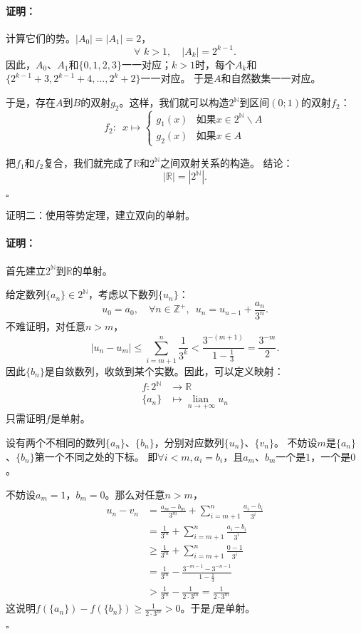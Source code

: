 \documentclass[12pt,UTF8]{ctexbook}
\newcommand{\lian}[1]{
    \underset{#1}{\operatorname{lian}\,}
}
\theoremstyle{definition}
\theoremstyle{plain}
\renewenvironment{proof}{\paragraph{\textbf{证明：}}}{\hfill$\square$}
\begin{document}
\begin{appendix}
\begin{proof}
    计算它们的势。$|A_0| = |A_1| = 2$，
    $$ \forall \,\, k > 1, \quad |A_k| = 2^{k-1}. $$
    因此，$A_0$、$A_1$和$\{0,1,2,3\}$一一对应；$k>1$时，每个$A_k$和$\{2^{k-1}+3,2^{k-1}+4,\ldots, 2^k+2\}$一一对应。
    于是$A$和自然数集一一对应。

    于是，存在$A$到$B$的双射$g_2$。这样，我们就可以构造$2^\mathbb{N}$到区间$(0;1)$的双射$f_2$：
    $$ f_2:\,\,\,x\mapsto \left\{
        \begin{array}{cl}
            g_1(x) & \mbox{如果}x \in 2^\mathbb{N}\backslash A \\
            g_2(x) & \mbox{如果}x \in A 
        \end{array}\right.
    $$

    把$f_1$和$f_2$复合，我们就完成了$\mathbb{R}$和$2^\mathbb{N}$之间双射关系的构造。
    结论：
    $$ |\mathbb{R}| = |2^\mathbb{N}|. $$

\end{proof}

证明二：使用等势定理，建立双向的单射。

\begin{proof}
    首先建立$2^\mathbb{N}$到$\mathbb{R}$的单射。

    给定数列$\{a_n\}\in2^\mathbb{N}$，考虑以下数列$\{u_n\}$：
    $$ u_0 = a_0, \quad  \forall n\in \mathbb{Z}^+ , \,\,\, u_n = u_{n-1} + \frac{a_n}{3^n}. $$
    不难证明，对任意$n>m$，
    $$|u_n - u_m| \leqslant \sum_{i=m+1}^n \frac{1}{3^k} < \frac{3^{-(m+1)}}{1 - \frac{1}{3}} = \frac{3^{-m}}{2}.$$
    因此$\{b_n\}$是自敛数列，收敛到某个实数。因此，可以定义映射：
    \begin{align*}
        f : 2^\mathbb{N} &\rightarrow \mathbb{R}  \\
        \{a_n\} &\mapsto \lian{n\to +\infty} u_n 
    \end{align*}
    只需证明$f$是单射。

    设有两个不相同的数列$\{a_n\}$、$\{b_n\}$，分别对应数列$\{u_n\}$、$\{v_n\}$。
    不妨设$m$是$\{a_n\}$、$\{b_n\}$第一个不同之处的下标。
    即$\forall i<m, a_i = b_i$，且$a_m$、$b_m$一个是$1$，一个是$0$。

    不妨设$a_m = 1$，$b_m = 0$。那么对任意$n>m$，
    \begin{align*}
        u_n - v_n &= \frac{a_m - b_m}{3^m} + \sum_{i=m+1}^n \frac{a_i - b_i}{3^i}  \\
        &= \frac{1}{3^m} + \sum_{i=m+1}^n \frac{a_i - b_i}{3^i}  \\
        &\geqslant \frac{1}{3^m} + \sum_{i=m+1}^n \frac{0 - 1}{3^i}  \\
        &= \frac{1}{3^m} - \frac{3^{-m-1} - 3^{-n-1}}{1 - \frac{1}{3}}  \\
        &> \frac{1}{3^m} - \frac{1}{2\cdot 3^m} = \frac{1}{2\cdot 3^m} 
    \end{align*}
    这说明$f(\{a_n\}) - f(\{b_n\}) \geqslant \frac{1}{2\cdot 3^m} > 0$。于是$f$是单射。


\end{proof}
\end{appendix}
\end{document}
